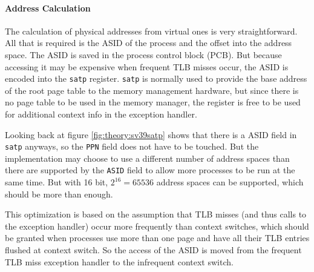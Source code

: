 


\paragraph{Address Calculation}
The calculation of physical addresses from virtual ones is very straightforward. All that is required is the ASID of the process and the offset into the address space.
The ASID is saved in the process control block (PCB). But because accessing it may be expensive when frequent TLB misses occur, the ASID is encoded into the \texttt{satp} register.
\texttt{satp} is normally used to provide the base address of the root page table to the memory management hardware, but since there is no page table to be used in the memory manager, the register is free to be used for additional context info in the exception handler.

Looking back at figure \ref{fig:theory:sv39satp} shows that there is a ASID field in \texttt{satp} anyways,
so the \texttt{PPN} field does not have to be touched.
But the implementation may choose to use a different number of address spaces than there are supported by the \texttt{ASID} field to allow more processes to be run at the same time.
But with 16 bit, $2^{16} = 65536$ address spaces can be supported, which should be more than enough.

This optimization is based on the assumption that TLB misses (and thus calls to the exception handler) occur more frequently than context switches, which should be granted when processes use more than one page and have all their TLB entries flushed at context switch.
So the access of the ASID is moved from the frequent TLB miss exception handler to the infrequent context switch. %






